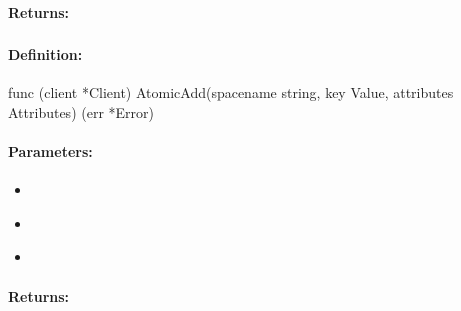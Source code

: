 \paragraph{Returns:}


\pagebreak
\subsubsection{}
\label{api:Go:AtomicAdd}


\paragraph{Definition:}
\begin{gocode}
func (client *Client) AtomicAdd(spacename string, key Value, attributes Attributes) (err *Error)
\end{gocode}

\paragraph{Parameters:}
\begin{itemize}[noitemsep]
\item {}\\

\item {}\\

\item {}\\

\end{itemize}

\paragraph{Returns:}


\pagebreak
\subsubsection{}
\label{api:Go:UxactAtomicAdd}


